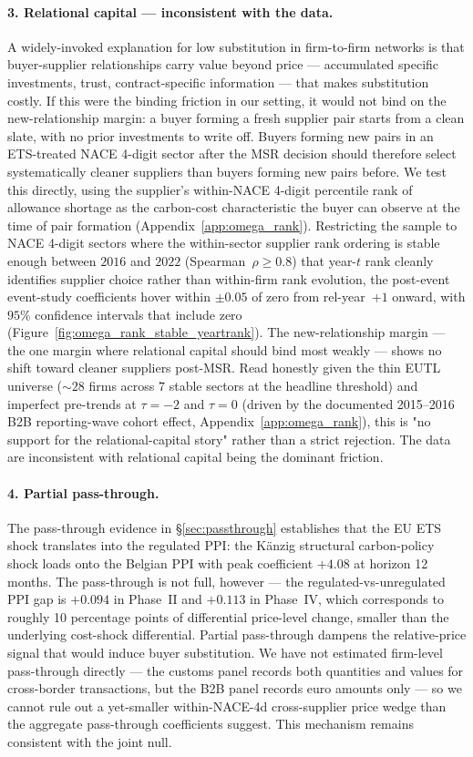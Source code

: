 \paragraph{3. Relational capital --- inconsistent with the data.} A widely-invoked explanation for low substitution in firm-to-firm networks is that buyer-supplier relationships carry value beyond price --- accumulated specific investments, trust, contract-specific information --- that makes substitution costly. If this were the binding friction in our setting, it would not bind on the new-relationship margin: a buyer forming a fresh supplier pair starts from a clean slate, with no prior investments to write off. Buyers forming new pairs in an ETS-treated NACE 4-digit sector after the MSR decision should therefore select systematically cleaner suppliers than buyers forming new pairs before. We test this directly, using the supplier's within-NACE 4-digit percentile rank of allowance shortage as the carbon-cost characteristic the buyer can observe at the time of pair formation (Appendix~\ref{app:omega_rank}). Restricting the sample to NACE 4-digit sectors where the within-sector supplier rank ordering is stable enough between $2016$ and $2022$ (Spearman~$\rho\geq 0.8$) that year-$t$ rank cleanly identifies supplier choice rather than within-firm rank evolution, the post-event event-study coefficients hover within $\pm 0.05$ of zero from rel-year~$+1$ onward, with $95\%$ confidence intervals that include zero (Figure~\ref{fig:omega_rank_stable_yeartrank}). The new-relationship margin --- the one margin where relational capital should bind most weakly --- shows no shift toward cleaner suppliers post-MSR. Read honestly given the thin EUTL universe ($\sim 28$ firms across $7$ stable sectors at the headline threshold) and imperfect pre-trends at $\tau=-2$ and $\tau=0$ (driven by the documented 2015--2016 B2B reporting-wave cohort effect, Appendix~\ref{app:omega_rank}), this is "no support for the relational-capital story" rather than a strict rejection. The data are inconsistent with relational capital being the dominant friction.

\paragraph{4. Partial pass-through.} The pass-through evidence in \S\ref{sec:passthrough} establishes that the EU ETS shock translates into the regulated PPI: the Känzig structural carbon-policy shock loads onto the Belgian PPI with peak coefficient $+4.08$ at horizon 12 months. The pass-through is not full, however --- the regulated-vs-unregulated PPI gap is $+0.094$ in Phase~II and $+0.113$ in Phase~IV, which corresponds to roughly 10 percentage points of differential price-level change, smaller than the underlying cost-shock differential. Partial pass-through dampens the relative-price signal that would induce buyer substitution. We have not estimated firm-level pass-through directly --- the customs panel records both quantities and values for cross-border transactions, but the B2B panel records euro amounts only --- so we cannot rule out a yet-smaller within-NACE-4d cross-supplier price wedge than the aggregate pass-through coefficients suggest. This mechanism remains consistent with the joint null.

